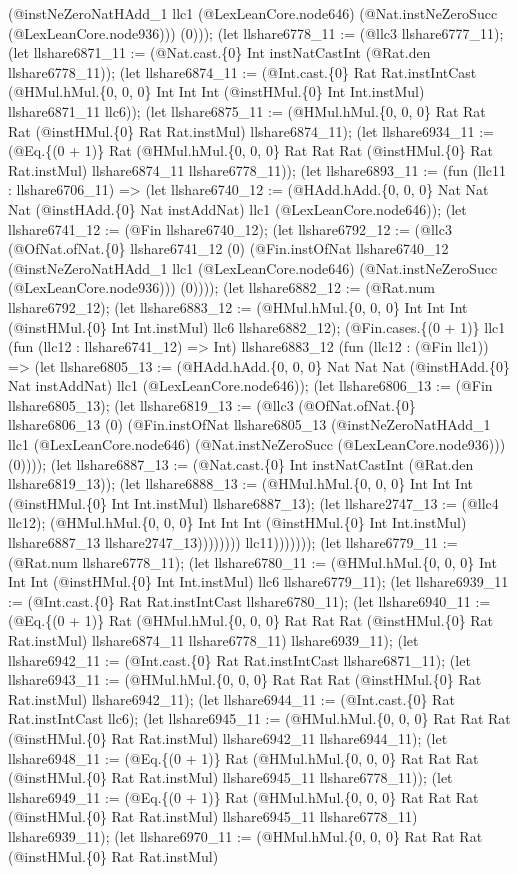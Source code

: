 \documentclass[11pt]{article}
\begin{document}
(@instNeZeroNatHAdd\_1 llc1 (@LexLeanCore.node646) (@Nat.instNeZeroSucc (@LexLeanCore.node936))) (0))); (let llshare6778\_11 := (@llc3 llshare6777\_11); (let llshare6871\_11 := (@Nat.cast.\{0\} Int instNatCastInt (@Rat.den llshare6778\_11)); (let llshare6874\_11 := (@Int.cast.\{0\} Rat Rat.instIntCast (@HMul.hMul.\{0, 0, 0\} Int Int Int (@instHMul.\{0\} Int Int.instMul) llshare6871\_11 llc6)); (let llshare6875\_11 := (@HMul.hMul.\{0, 0, 0\} Rat Rat Rat (@instHMul.\{0\} Rat Rat.instMul) llshare6874\_11); (let llshare6934\_11 := (@Eq.\{(0 + 1)\} Rat (@HMul.hMul.\{0, 0, 0\} Rat Rat Rat (@instHMul.\{0\} Rat Rat.instMul) llshare6874\_11 llshare6778\_11)); (let llshare6893\_11 := (fun (llc11 : llshare6706\_11) => (let llshare6740\_12 := (@HAdd.hAdd.\{0, 0, 0\} Nat Nat Nat (@instHAdd.\{0\} Nat instAddNat) llc1 (@LexLeanCore.node646)); (let llshare6741\_12 := (@Fin llshare6740\_12); (let llshare6792\_12 := (@llc3 (@OfNat.ofNat.\{0\} llshare6741\_12 (0) (@Fin.instOfNat llshare6740\_12 (@instNeZeroNatHAdd\_1 llc1 (@LexLeanCore.node646) (@Nat.instNeZeroSucc (@LexLeanCore.node936))) (0)))); (let llshare6882\_12 := (@Rat.num llshare6792\_12); (let llshare6883\_12 := (@HMul.hMul.\{0, 0, 0\} Int Int Int (@instHMul.\{0\} Int Int.instMul) llc6 llshare6882\_12); (@Fin.cases.\{(0 + 1)\} llc1 (fun (llc12 : llshare6741\_12) => Int) llshare6883\_12 (fun (llc12 : (@Fin llc1)) => (let llshare6805\_13 := (@HAdd.hAdd.\{0, 0, 0\} Nat Nat Nat (@instHAdd.\{0\} Nat instAddNat) llc1 (@LexLeanCore.node646)); (let llshare6806\_13 := (@Fin llshare6805\_13); (let llshare6819\_13 := (@llc3 (@OfNat.ofNat.\{0\} llshare6806\_13 (0) (@Fin.instOfNat llshare6805\_13 (@instNeZeroNatHAdd\_1 llc1 (@LexLeanCore.node646) (@Nat.instNeZeroSucc (@LexLeanCore.node936))) (0)))); (let llshare6887\_13 := (@Nat.cast.\{0\} Int instNatCastInt (@Rat.den llshare6819\_13)); (let llshare6888\_13 := (@HMul.hMul.\{0, 0, 0\} Int Int Int (@instHMul.\{0\} Int Int.instMul) llshare6887\_13); (let llshare2747\_13 := (@llc4 llc12); (@HMul.hMul.\{0, 0, 0\} Int Int Int (@instHMul.\{0\} Int Int.instMul) llshare6887\_13 llshare2747\_13)))))))) llc11))))))); (let llshare6779\_11 := (@Rat.num llshare6778\_11); (let llshare6780\_11 := (@HMul.hMul.\{0, 0, 0\} Int Int Int (@instHMul.\{0\} Int Int.instMul) llc6 llshare6779\_11); (let llshare6939\_11 := (@Int.cast.\{0\} Rat Rat.instIntCast llshare6780\_11); (let llshare6940\_11 := (@Eq.\{(0 + 1)\} Rat (@HMul.hMul.\{0, 0, 0\} Rat Rat Rat (@instHMul.\{0\} Rat Rat.instMul) llshare6874\_11 llshare6778\_11) llshare6939\_11); (let llshare6942\_11 := (@Int.cast.\{0\} Rat Rat.instIntCast llshare6871\_11); (let llshare6943\_11 := (@HMul.hMul.\{0, 0, 0\} Rat Rat Rat (@instHMul.\{0\} Rat Rat.instMul) llshare6942\_11); (let llshare6944\_11 := (@Int.cast.\{0\} Rat Rat.instIntCast llc6); (let llshare6945\_11 := (@HMul.hMul.\{0, 0, 0\} Rat Rat Rat (@instHMul.\{0\} Rat Rat.instMul) llshare6942\_11 llshare6944\_11); (let llshare6948\_11 := (@Eq.\{(0 + 1)\} Rat (@HMul.hMul.\{0, 0, 0\} Rat Rat Rat (@instHMul.\{0\} Rat Rat.instMul) llshare6945\_11 llshare6778\_11)); (let llshare6949\_11 := (@Eq.\{(0 + 1)\} Rat (@HMul.hMul.\{0, 0, 0\} Rat Rat Rat (@instHMul.\{0\} Rat Rat.instMul) llshare6945\_11 llshare6778\_11) llshare6939\_11); (let llshare6970\_11 := (@HMul.hMul.\{0, 0, 0\} Rat Rat Rat (@instHMul.\{0\} Rat Rat.instMul) 
\end{document}
